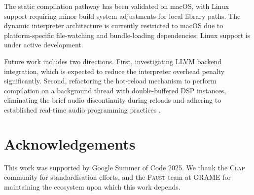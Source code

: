 \documentclass[twoside,a4paper]{article}
\newcommand{\F}{\textsc{Faust}}
\newcommand{\CLAP}{\textsc{Clap}}
\begin{document}
The static compilation pathway has been validated on macOS, with Linux support requiring minor build system adjustments for local library paths. The dynamic interpreter architecture is currently restricted to macOS due to platform-specific file-watching and bundle-loading dependencies; Linux support is under active development.

Future work includes two directions. First, investigating LLVM backend integration, which is expected to reduce the interpreter overhead penalty significantly. Second, refactoring the hot-reload mechanism to perform compilation on a background thread with double-buffered DSP instances, eliminating the brief audio discontinuity during reloads and adhering to established real-time audio programming practices \cite{Bencina2011}. 

\section{Acknowledgements}

This work was supported by Google Summer of Code 2025. We thank the \CLAP{} community for standardisation efforts, and the \F{} team at GRAME for maintaining the ecosystem upon which this work depends.



\end{document}

